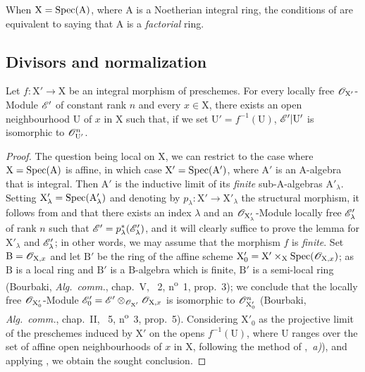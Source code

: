 \begin{remark}[21.7.7]
\label{IV.21.7.7}
When $\mathrm{X}=\operatorname{Spec}(\mathrm{A})$, where $\mathrm{A}$ is a Noetherian integral ring, the conditions of  are equivalent to saying that $\mathrm{A}$ is a \emph{factorial} ring.
\end{remark}


\subsection{Divisors and normalization}
\label{subsection:IV.21.8}

\begin{lemma}[21.8.1]
\label{IV.21.8.1}
Let $f:\mathrm{X}'\to\mathrm{X}$ be an integral morphism of preschemes.
For every locally free $\mathscr{O}_{\mathrm{X}'}$-Module $\mathscr{E}'$ of constant rank $n$ and every $x\in\mathrm{X}$, there exists an open neighbourhood $\mathrm{U}$ of $x$ in $\mathrm{X}$ such that, if we set $\mathrm{U}'=f^{-1}(\mathrm{U})$, $\mathscr{E}'|\mathrm{U}'$ is isomorphic to $\mathscr{O}_{\mathrm{U}'}^n$.
\end{lemma}

\begin{proof}
The question being local on $\mathrm{X}$, we can restrict to the case where $\mathrm{X}=\operatorname{Spec}(\mathrm{A})$ is affine, in which case $\mathrm{X}'=\operatorname{Spec}(\mathrm{A}')$, where $\mathrm{A}'$ is an $\mathrm{A}$-algebra that is integral.
Then $\mathrm{A}'$ is the inductive limit of its \emph{finite} sub-$\mathrm{A}$-algebras $\mathrm{A}'_\lambda$.
Setting $\mathrm{X}'_\lambda=\operatorname{Spec}(\mathrm{A}'_\lambda)$ and denoting by $p_\lambda:\mathrm{X}'\to\mathrm{X}'_\lambda$ the structural morphism, it follows from  and  that there exists an index $\lambda$ and an $\mathscr{O}_{\mathrm{X}'_\lambda}$-Module locally free $\mathscr{E}'_\lambda$ of rank $n$ such that $\mathscr{E}'=p_\lambda^*(\mathscr{E}'_\lambda)$, and it will clearly suffice to prove the lemma for $\mathrm{X}'_\lambda$ and $\mathscr{E}'_\lambda$;
in other words, we may assume that the morphism $f$ is \emph{finite}.
Set $\mathrm{B}=\mathscr{O}_{\mathrm{X},x}$ and let $\mathrm{B}'$ be the ring of the affine scheme $\mathrm{X}'_0=\mathrm{X}'\times_\mathrm{X}\operatorname{Spec}(\mathscr{O}_{\mathrm{X},x})$;
as $\mathrm{B}$ is a local ring and $\mathrm{B}'$ is a $\mathrm{B}$-algebra which is finite, $\mathrm{B}'$ is a semi-local ring (Bourbaki, \emph{Alg.\ comm.}, chap.~V, \textsection~2, n\textsuperscript{o}~1, prop.~3);
we conclude that the locally free $\mathscr{O}_{\mathrm{X}'_0}$-Module $\mathscr{E}'_0=\mathscr{E}'\otimes_{\mathscr{O}_{\mathrm{X}'}}\mathscr{O}_{\mathrm{X},x}$ is isomorphic to $\mathscr{O}_{\mathrm{X}'_0}^n$ (Bourbaki, \emph{Alg.\ comm.}, chap.~II, \textsection~5, n\textsuperscript{o}~3, prop.~5).
Considering $\mathrm{X}'_0$ as the
projective limit of the preschemes induced by $\mathrm{X}'$ on the opens $f^{-1}(\mathrm{U})$, where $\mathrm{U}$ ranges over the set of affine open neighbourhoods of $x$ in $\mathrm{X}$, following the method of ,{}~\emph{a)}), and applying , we obtain the sought conclusion.
\end{proof}

